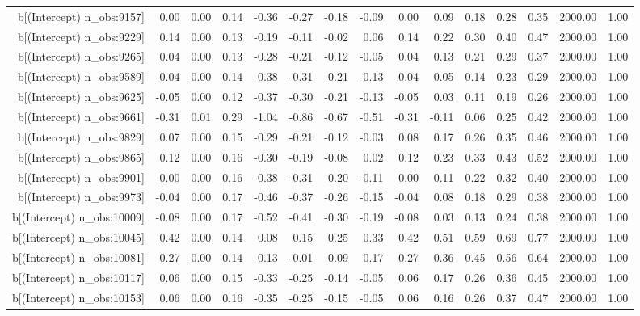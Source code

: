 \begin{table}[ht]
\begin{tabular}{rrrrrrrrrrrrrrr}
  b[(Intercept) n\_obs:9157] & 0.00 & 0.00 & 0.14 & -0.36 & -0.27 & -0.18 & -0.09 & 0.00 & 0.09 & 0.18 & 0.28 & 0.35 & 2000.00 & 1.00 \\ 
  b[(Intercept) n\_obs:9229] & 0.14 & 0.00 & 0.13 & -0.19 & -0.11 & -0.02 & 0.06 & 0.14 & 0.22 & 0.30 & 0.40 & 0.47 & 2000.00 & 1.00 \\ 
  b[(Intercept) n\_obs:9265] & 0.04 & 0.00 & 0.13 & -0.28 & -0.21 & -0.12 & -0.05 & 0.04 & 0.13 & 0.21 & 0.29 & 0.37 & 2000.00 & 1.00 \\ 
  b[(Intercept) n\_obs:9589] & -0.04 & 0.00 & 0.14 & -0.38 & -0.31 & -0.21 & -0.13 & -0.04 & 0.05 & 0.14 & 0.23 & 0.29 & 2000.00 & 1.00 \\ 
  b[(Intercept) n\_obs:9625] & -0.05 & 0.00 & 0.12 & -0.37 & -0.30 & -0.21 & -0.13 & -0.05 & 0.03 & 0.11 & 0.19 & 0.26 & 2000.00 & 1.00 \\ 
  b[(Intercept) n\_obs:9661] & -0.31 & 0.01 & 0.29 & -1.04 & -0.86 & -0.67 & -0.51 & -0.31 & -0.11 & 0.06 & 0.25 & 0.42 & 2000.00 & 1.00 \\ 
  b[(Intercept) n\_obs:9829] & 0.07 & 0.00 & 0.15 & -0.29 & -0.21 & -0.12 & -0.03 & 0.08 & 0.17 & 0.26 & 0.35 & 0.46 & 2000.00 & 1.00 \\ 
  b[(Intercept) n\_obs:9865] & 0.12 & 0.00 & 0.16 & -0.30 & -0.19 & -0.08 & 0.02 & 0.12 & 0.23 & 0.33 & 0.43 & 0.52 & 2000.00 & 1.00 \\ 
  b[(Intercept) n\_obs:9901] & 0.00 & 0.00 & 0.16 & -0.38 & -0.31 & -0.20 & -0.11 & 0.00 & 0.11 & 0.22 & 0.32 & 0.40 & 2000.00 & 1.00 \\ 
  b[(Intercept) n\_obs:9973] & -0.04 & 0.00 & 0.17 & -0.46 & -0.37 & -0.26 & -0.15 & -0.04 & 0.08 & 0.18 & 0.29 & 0.38 & 2000.00 & 1.00 \\ 
  b[(Intercept) n\_obs:10009] & -0.08 & 0.00 & 0.17 & -0.52 & -0.41 & -0.30 & -0.19 & -0.08 & 0.03 & 0.13 & 0.24 & 0.38 & 2000.00 & 1.00 \\ 
  b[(Intercept) n\_obs:10045] & 0.42 & 0.00 & 0.14 & 0.08 & 0.15 & 0.25 & 0.33 & 0.42 & 0.51 & 0.59 & 0.69 & 0.77 & 2000.00 & 1.00 \\ 
  b[(Intercept) n\_obs:10081] & 0.27 & 0.00 & 0.14 & -0.13 & -0.01 & 0.09 & 0.17 & 0.27 & 0.36 & 0.45 & 0.56 & 0.64 & 2000.00 & 1.00 \\ 
  b[(Intercept) n\_obs:10117] & 0.06 & 0.00 & 0.15 & -0.33 & -0.25 & -0.14 & -0.05 & 0.06 & 0.17 & 0.26 & 0.36 & 0.45 & 2000.00 & 1.00 \\ 
  b[(Intercept) n\_obs:10153] & 0.06 & 0.00 & 0.16 & -0.35 & -0.25 & -0.15 & -0.05 & 0.06 & 0.16 & 0.26 & 0.37 & 0.47 & 2000.00 & 1.00 \\ 

\end{tabular}
\end{table}
